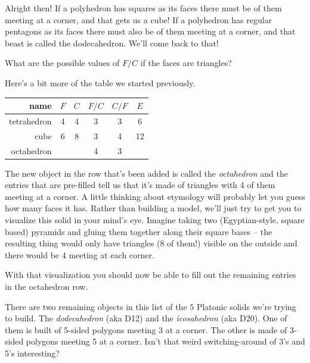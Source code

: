 Alright then! If a polyhedron has squares as its faces there must be \underline{\hstrut} of them meeting at a corner, and that gets us a cube!  If a polyhedron has regular pentagons as its faces there must also be \underline{\hstrut} of them meeting at a corner, and that beast is called the dodecahedron.  We'll come back to that!

What are the possible values of $F/C$ if the faces are triangles?

\vspace{.5in} 

Here's a bit more of the table we started previously.

\bigskip
\setlength{\tabcolsep}{18pt}
\begin{tabular}{r|c|c|c|c|c} 
\bigstrut name        & $F$ & $C$ & $F/C$ & $C/F$ & $E$ \\ \hline
\bigstrut tetrahedron & 4   & 4   & 3     & 3     & 6 \\ \hline
\bigstrut cube        & 6   & 8   & 3     & 4     & 12 \\ \hline
\bigstrut octahedron  &     &     & 4     & 3     &   \\
\end{tabular}
\bigskip

The new object in the row that's been added is called the {\em octahedron} and the entries that are pre-filled tell us that it's made of triangles with 4 of them meeting at a corner. A little thinking about etymology will probably let you guess how many faces it has.  Rather than building a model, we'll just try to get you to visualize this solid in your mind's eye.  Imagine taking two (Egyptian-style, square based) pyramids and gluing them together along their square bases -- the resulting thing would only have triangles (8 of them!) visible on the outside and there would be $4$ meeting at each corner.


With that visualization you should now be able to fill out the remaining entries in the octahedron row.

There are two remaining objects in this list of the $5$ Platonic solids we're trying to build.
The {\em dodecahedron} (aka D12) and the {\em icosahedron} (aka D20).  One of them is built of 5-sided polygons meeting 3 at a corner.  The other is made of 3-sided polygons meeting 5 at a corner.  Isn't that weird switching-around of 3's and 5's interesting?

